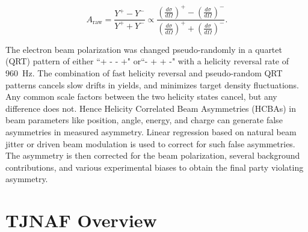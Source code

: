 \begin{equation} \label{equ:asymmetryDefinition}
A_{\textrm{raw}} = \frac{Y^{+}-Y^{-}}{Y^{+}+Y^{-}} \propto \frac{\displaystyle \left(\frac{d\sigma}{d\Omega}\right)^{+} - \left(\frac{d\sigma}{d\Omega}\right)^{-} }{\displaystyle \left(\frac{d\sigma}{d\Omega}\right)^{+} + \left(\frac{d\sigma}{d\Omega}\right)^{-}}.
\end{equation}

The electron beam polarization was changed pseudo-randomly in a quartet (QRT) pattern of either ``+ - - +" or``- + + -" with a helicity reversal rate of 960~Hz. The combination of fast helicity reversal and pseudo-random QRT patterns cancels slow drifts in yields, and minimizes target density fluctuations. Any common scale factors between the two helicity states cancel, but any difference does not. Hence Helicity Correlated Beam Asymmetries (HCBAs) in beam parameters like position, angle, energy, and charge can generate false asymmetries in measured asymmetry. Linear regression based on natural beam jitter or driven beam modulation is used to correct for such false asymmetries. The asymmetry is then corrected for the beam polarization, several background contributions, and various experimental biases to obtain the final party violating asymmetry.


\section{TJNAF Overview}%
\label{TJNAF}

